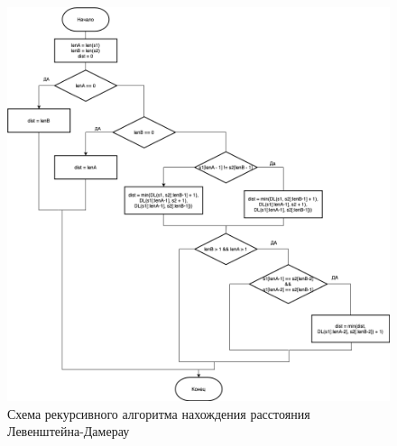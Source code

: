 \begin{figure}[h]
	\centering
	\includegraphics[width=1\linewidth]{img/DLR.jpg}
	\caption{Схема рекурсивного алгоритма нахождения расстояния Левенштейна-Дамерау}
	\label{fig:mpr}
\end{figure}

\clearpage

